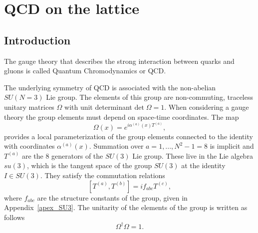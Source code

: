 \chapter{QCD on the lattice}%


\label{ch_foundation}


\section{Introduction}
\label{ch_foundation:sec:general}

The gauge theory that describes the strong interaction between quarks and gluons is called Quantum Chromodynamics or QCD. 

The underlying symmetry of QCD is associated with the non-abelian $SU(N=3)$ Lie group. The elements of this group are non-commuting, traceless unitary matrices $\Omega$ with unit determinant $\textrm{det}\;\Omega=1$. When considering a gauge theory the group elements must depend on space-time coordinates. The map
\begin{equation}
\Omega(x)=e^{i\alpha^{(a)}(x)T^{(a)}},
\end{equation}
provides a local parameterization of the group elements connected to the identity with coordinates $\alpha^{(a)}(x)$. Summation over $a=1,...,N^2-1=8$ is implicit and $T^{(a)}$ are the 8 generators of the $SU(3)$ Lie group. These live in the Lie algebra $su(3)$, which is the tangent space of the group $SU(3)$ at the identity $I\in SU(3)$. They satisfy the commutation relations
\begin{equation}
\left[T^{(a)}, T^{(b)}\right]=if_{abc}T^{(c)},
\end{equation}
where $f_{abc}$ are the structure constants of the group, given in Appendix~\ref{apex_SU3}. The unitarity of the elements of the group is written as follows
\begin{equation}
\Omega^{\dagger}\Omega=1.
\end{equation}

